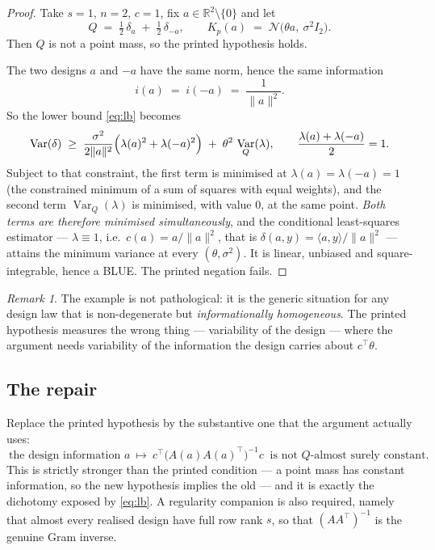 \documentclass[11pt]{article}
\theoremstyle{plain}
\theoremstyle{definition}
\theoremstyle{remark}
\newtheorem*{remark}{Remark}
\DeclareMathOperator{\Var}{Var}
\newcommand{\R}{\mathbb{R}}
\begin{document}
\begin{proof}
Take $s=1$, $n=2$, $c=1$, fix $a\in\R^{2}\setminus\{0\}$ and let
\[
  Q \;=\; \tfrac12\,\delta_{a} \;+\; \tfrac12\,\delta_{-a},
  \qquad
  K_p(a) \;=\; \mathcal{N}\bigl(\theta a,\ \sigma^{2}I_2\bigr).
\]
Then $Q$ is not a point mass, so the printed hypothesis holds.

The two designs $a$ and $-a$ have the same norm, hence the same information
\[
  i(a) \;=\; i(-a) \;=\; \frac{1}{\|a\|^{2}} .
\]
So the lower bound \eqref{eq:lb} becomes
\[
  \Var(\delta)
  \;\ge\; \frac{\sigma^{2}}{2\|a\|^{2}}\Bigl(\lambda(a)^{2}+\lambda(-a)^{2}\Bigr)
      \;+\; \theta^{2}\,\Var_Q(\lambda),
  \qquad
  \frac{\lambda(a)+\lambda(-a)}{2}=1 .
\]
Subject to that constraint, the first term is minimised at
$\lambda(a)=\lambda(-a)=1$ (the constrained minimum of a sum of squares with equal weights),
and the second term $\Var_Q(\lambda)$ is minimised, with value $0$, at the same point.
\emph{Both terms are therefore minimised simultaneously}, and the conditional least-squares
estimator --- $\lambda\equiv 1$, i.e.\ $c(a)=a/\|a\|^{2}$, that is
$\delta(a,y)=\langle a,y\rangle/\|a\|^{2}$ --- attains the minimum variance at every
$(\theta,\sigma^{2})$. It is linear, unbiased and square-integrable, hence a BLUE. The
printed negation fails.
\end{proof}

\begin{remark}
The example is not pathological: it is the generic situation for any design law that is
non-degenerate but \emph{informationally homogeneous}. The printed hypothesis measures the
wrong thing --- variability of the design --- where the argument needs variability of the
information the design carries about $c^{\!\top}\theta$.
\end{remark}

\subsection{The repair}

Replace the printed hypothesis by the substantive one that the argument actually uses:
\[
  \boxed{\ \text{the design information } a\ \mapsto\ c^{\!\top}\bigl(A(a)A(a)^{\!\top}\bigr)^{-1}c
  \ \text{ is not } Q\text{-almost surely constant.}\ }
\]
This is strictly stronger than the printed condition --- a point mass has constant
information, so the new hypothesis implies the old --- and it is exactly the dichotomy
exposed by \eqref{eq:lb}. A regularity companion is also required, namely that almost every
realised design have full row rank $s$, so that $(AA^{\!\top})^{-1}$ is the genuine Gram
inverse.
\end{document}
